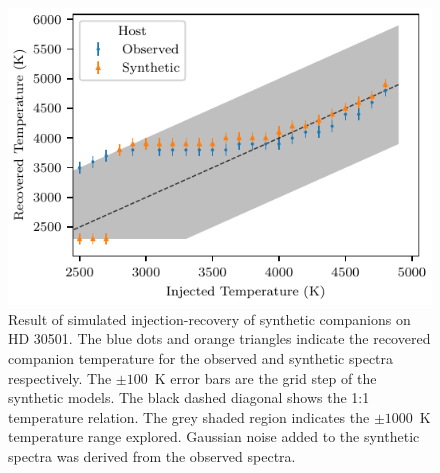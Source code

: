 \documentclass[fleqn,usenatbib]{mnras}
\begin{document}
\begin{figure}
    \centering
    \includegraphics[width=0.95\hsize]{images/fig7.pdf}
    \caption{Result of simulated injection-recovery of synthetic companions on {HD 30501}. The blue dots and orange triangles indicate the recovered companion temperature for the observed and synthetic spectra respectively. The \(\pm100\)~K error bars are the grid step of the synthetic models. The black dashed diagonal shows the 1:1 temperature relation. The grey shaded region indicates the \(\pm1000\)~K temperature range explored. Gaussian noise added to the synthetic spectra was derived from the observed spectra.}
    \label{fig:injection-recovery}
\end{figure}
\end{document}
